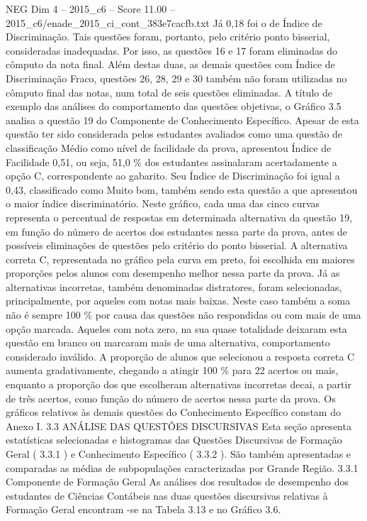 \begin{textsample}{NEG Dim 4 – 2015\_c6 – Score 11.00 – 2015\_c6/enade\_2015\_ci\_cont\_383e7cacfb.txt}
Já 0,18 foi o de Índice de Discriminação.
Tais questões foram, portanto, pelo critério ponto bisserial, consideradas inadequadas.
Por isso, as questões 16 e 17 foram eliminadas do cômputo da nota final.
Além destas duas, as demais questões com Índice de Discriminação Fraco, questões 26, 28, 29 e 30 também não foram utilizadas no cômputo final das notas, num total de seis questões eliminadas.
A título de exemplo das análises do comportamento das questões objetivas, o Gráfico 3.5 analisa a questão 19 do Componente de Conhecimento Específico.
Apesar de esta questão ter sido considerada pelos estudantes avaliados como uma questão de classificação Médio como nível de facilidade da prova, apresentou Índice de Facilidade 0,51, ou seja, 51,0 \% dos estudantes assinalaram acertadamente a opção C, correspondente ao gabarito.
Seu Índice de Discriminação foi igual a 0,43, classificado como Muito bom, também sendo esta questão a que apresentou o maior índice discriminatório.
Neste gráfico, cada uma das cinco curvas representa o percentual de respostas em determinada alternativa da questão 19, em função do número de acertos dos estudantes nessa parte da prova, antes de possíveis eliminações de questões pelo critério do ponto bisserial.
A alternativa correta C, representada no gráfico pela curva em preto, foi escolhida em maiores proporções pelos alunos com desempenho melhor nessa parte da prova.
Já as alternativas incorretas, também denominadas distratores, foram selecionadas, principalmente, por aqueles com notas mais baixas.
Neste caso também a soma não é sempre 100 \% por causa das questões não respondidas ou com mais de uma opção marcada.
Aqueles com nota zero, na sua quase totalidade deixaram esta questão em branco ou marcaram mais de uma alternativa, comportamento considerado inválido.
A proporção de alunos que selecionou a resposta correta C aumenta gradativamente, chegando a atingir 100 \% para 22 acertos ou mais, enquanto a proporção dos que escolheram alternativas incorretas decai, a partir de três acertos, como função do número de acertos nessa parte da prova.
Os gráficos relativos às demais questões do Conhecimento Específico constam do Anexo I. 3.3 ANÁLISE DAS QUESTÕES DISCURSIVAS Esta seção apresenta estatísticas selecionadas e histogramas das Questões Discursivas de Formação Geral ( 3.3.1 ) e Conhecimento Específico ( 3.3.2 ).
São também apresentadas e comparadas as médias de subpopulações caracterizadas por Grande Região. 3.3.1 Componente de Formação Geral As análises dos resultados de desempenho dos estudantes de Ciências Contábeis nas duas questões discursivas relativas à Formação Geral encontram -se na Tabela 3.13 e no Gráfico 3.6.

\end{textsample}

